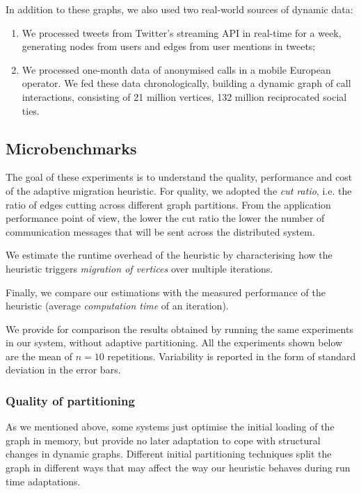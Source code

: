 \documentclass{sig-alternate-10pt}
\begin{document}
In addition to these graphs, we also used two real-world sources of dynamic data: 

\begin{enumerate}
\item We processed tweets from Twitter's streaming API  in real-time for a week, generating nodes from users and edges from user mentions in tweets; 
\item We processed one-month data of anonymised calls in a mobile European operator. We fed these data chronologically, building a dynamic graph of call interactions, consisting of 21 million vertices, 132 million reciprocated social ties. 

\end{enumerate}



\subsection{Microbenchmarks}
\label{sec:ubenchmark}

The goal of these experiments is to understand the quality, performance and cost of the adaptive migration heuristic. For quality, we adopted the \emph{cut ratio}, i.e. the ratio of edges cutting across different graph partitions. From the application performance point of view, the lower the cut ratio the lower the number of communication messages that will be sent across the distributed system.

We estimate the runtime overhead of the heuristic  by characterising how the heuristic triggers \emph{migration of vertices} over multiple iterations. 

Finally, we compare our estimations with the measured performance of the heuristic (average \emph{computation time} of an iteration). 

We provide for comparison the results obtained by running the same experiments in our system, without adaptive partitioning. All the experiments shown below are the mean of $n=10$ repetitions. Variability is reported in the form of standard deviation in the error bars. \newline
 


\subsubsection{Quality of partitioning}

As we mentioned above, some systems just optimise the initial loading of the graph in memory, but provide no later adaptation to cope with structural changes in dynamic graphs. Different initial partitioning techniques split the graph in different ways that may affect the way our heuristic behaves during run time adaptations. 
\end{document}
